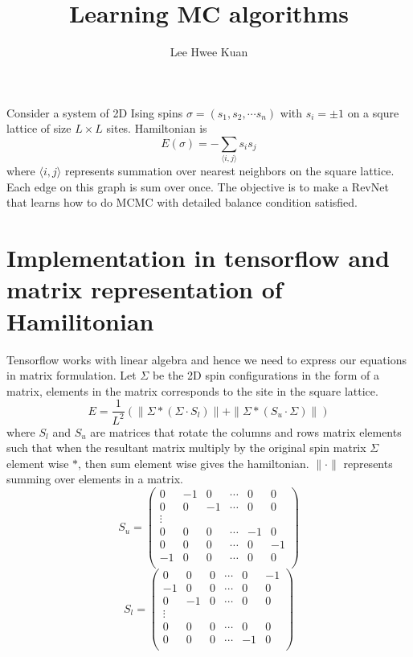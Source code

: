 \documentclass{article}
\title{Learning MC algorithms}
\author{Lee Hwee Kuan}
\begin{document}
\maketitle

Consider a system of 2D Ising spins $\sigma = (s_1,s_2, \cdots s_n)$ with $s_i =\pm 1$
on a squre lattice of size $L \times L$ sites.
Hamiltonian is 
\begin{equation}
E(\sigma) = - \sum_{\langle i,j\rangle} s_i s_j
\end{equation}
where $\langle i,j \rangle$ represents summation over nearest neighbors on 
the square lattice. Each edge on this graph is sum over once.
The objective is to make a RevNet that learns how to do MCMC with detailed balance
condition satisfied.

\section{Implementation in tensorflow and matrix representation of Hamilitonian}

Tensorflow works with linear algebra and hence we need to express our equations
in matrix formulation. Let $\Sigma$ be the 2D spin configurations in the form
of a matrix, elements in the matrix corresponds to the site in the square lattice.
\begin{equation}
E = \frac{1}{L^2} \left(
\|\Sigma * \left( \Sigma \cdot S_l \right)\| +\| \Sigma * \left( S_u \cdot \Sigma \right)\|
\right)
\end{equation}
where $S_l$ and $S_u$ are matrices that rotate the columns and rows matrix elements such that 
when the resultant matrix multiply by the original spin matrix $\Sigma$ element wise $*$, 
then sum element wise gives the hamiltonian. $\|\cdot\|$ represents summing over elements
in a matrix.
\begin{equation}
S_u = \left( \begin{array}{cccccc}
0  &-1 & 0 & \cdots & 0 & 0 \\
0  & 0 &-1 & \cdots & 0 & 0 \\
\vdots & & & & \\
0  & 0 & 0 & \cdots &-1 & 0 \\
0  & 0 & 0 & \cdots & 0 &-1 \\
-1 & 0 & 0 & \cdots & 0 & 0 \\
\end{array} \right)
\end{equation}
\begin{equation}
S_l = \left( \begin{array}{cccccc}
0   & 0 & 0 & \cdots & 0 & -1 \\
-1  & 0 & 0 & \cdots & 0 & 0 \\
0   &-1 & 0 & \cdots & 0 & 0 \\
\vdots & & & & \\
0  & 0 & 0 & \cdots & 0 & 0 \\
0  & 0 & 0 & \cdots &-1 & 0 \\
\end{array} \right)
\end{equation}
\end{document}
